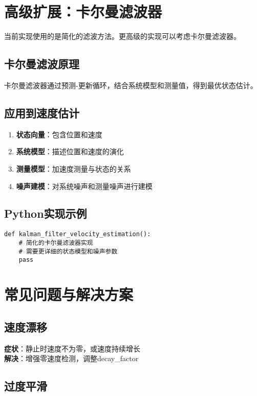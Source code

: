 \documentclass[12pt,a4paper]{article}
\begin{document}
\section{高级扩展：卡尔曼滤波器}

当前实现使用的是简化的滤波方法。更高级的实现可以考虑卡尔曼滤波器。

\subsection{卡尔曼滤波原理}

卡尔曼滤波器通过预测-更新循环，结合系统模型和测量值，得到最优状态估计。

\subsection{应用到速度估计}

\begin{enumerate}
    \item \textbf{状态向量}：包含位置和速度
    \item \textbf{系统模型}：描述位置和速度的演化
    \item \textbf{测量模型}：加速度测量与状态的关系
    \item \textbf{噪声建模}：对系统噪声和测量噪声进行建模
\end{enumerate}

\subsection{Python实现示例}

\begin{lstlisting}
def kalman_filter_velocity_estimation():
    # 简化的卡尔曼滤波器实现
    # 需要更详细的状态模型和噪声参数
    pass
\end{lstlisting}

\section{常见问题与解决方案}

\subsection{速度漂移}

\textbf{症状}：静止时速度不为零，或速度持续增长\\
\textbf{解决}：增强零速度检测，调整decay\_factor

\subsection{过度平滑}
\end{document}
